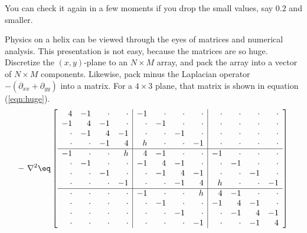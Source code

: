You can check it again in a few moments
if you drop the small values, say 0.2 and smaller.
\par
Physics on a helix can be viewed through the eyes
of matrices and numerical analysis.
This presentation is not easy, 
because the matrices are so huge.
Discretize the $(x,y)$-plane to an $N\times M$ array,
and pack the array into a vector of $N\times M$ components.
Likewise, pack minus the Laplacian operator $-(\partial_{xx}+\partial_{yy})$
into a matrix.
For a $4\times 3$ plane, that matrix is shown in equation (\ref{eqn:huge}).
\begin{equation}
\label{eqn:huge}
-\ \nabla^2 \eq
\left[
\begin{array}{rrrr|rrrr|rrrr}
  4 & -1 & \cdot & \cdot 
& -1 & \cdot & \cdot & \cdot 
& \cdot & \cdot & \cdot & \cdot  \\
  -1  &   4  &   -1     &  \cdot 
&  \cdot &-1 & \cdot  & \cdot 
& \cdot  &  \cdot  &  \cdot &  \cdot    \\
\cdot & -1  &   4  & -1  
&  \cdot  &  \cdot &-1  &  \cdot 
&  \cdot  &  \cdot  &  \cdot  &  \cdot   \\
\cdot &  \cdot & -1 &   4  
&  h  &  \cdot  &  \cdot &-1 
&  \cdot  &  \cdot  &  \cdot  &  \cdot  \\
\hline
  -1  &  \cdot  &  \cdot  &  h 
&   4   &  -1   &  \cdot  &  \cdot 
& -1  &  \cdot  &  \cdot &  \cdot 
\\
   \cdot &-1 & \cdot  &  \cdot 
& -1  &   4  &   -1     &  \cdot 
&  \cdot &-1 & \cdot  &  \cdot 
\\
  \cdot  &  \cdot &-1  &  \cdot 
&  \cdot &   -1     &   4   & -1  
& \cdot  &  \cdot &-1  &  \cdot 
\\
  \cdot  &  \cdot  &  \cdot &-1 
& \cdot  &  \cdot  & -1  &   4  
& h  &  \cdot  &  \cdot &-1 
\\
\hline
  \cdot  &  \cdot  &  \cdot  &  \cdot 
& -1  &  \cdot  &  \cdot  &  h 
&   4   &  -1   &  \cdot  &  \cdot 
\\
  \cdot  &  \cdot  &  \cdot  &  \cdot 
&  \cdot &-1 & \cdot  &  \cdot 
& -1  &   4  &   -1     &  \cdot 
\\
  \cdot  &  \cdot  &  \cdot  &  \cdot 
& \cdot  &  \cdot &-1  &  \cdot 
&  \cdot &   -1     &   4   & -1  
\\
  \cdot  &  \cdot  &  \cdot  &  \cdot 
& \cdot  &  \cdot  &  \cdot &-1 
& \cdot  &  \cdot  & -1  &   4  
\end{array}
\right]
\end{equation}
\par\noindent
